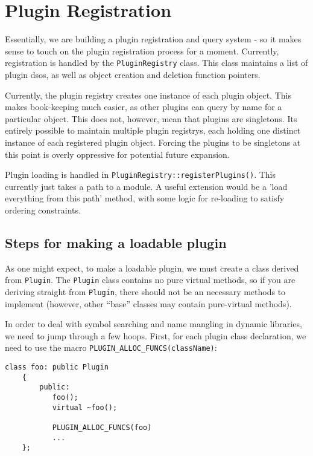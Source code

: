 
\section{Plugin Registration}

Essentially, we are building a plugin registration and
query system - so it makes sense to touch on the plugin 
registration process for a moment. Currently, registration 
is handled by the {\tt PluginRegistry} class. This class maintains
a list of plugin dsos, as well as object creation and deletion function
pointers. 

Currently, the plugin registry creates one instance of each 
plugin object. This makes book-keeping much easier, as other plugins
can query by name for a particular object. This does not, however, 
mean that plugins are singletons. Its entirely possible to maintain
multiple plugin registrys, each holding one distinct instance of
each registered plugin object. Forcing the plugins to be singletons 
at this point is overly oppressive for potential future expansion.

Plugin loading is handled in {\tt PluginRegistry::registerPlugins()}. 
This currently just takes a path to a module. A useful extension would
be a 'load everything from this path' method, with some logic for
re-loading to satisfy ordering constraints.

\subsection{Steps for making a loadable plugin}

As one might expect, to make a loadable plugin, we must create a 
class derived from {\tt Plugin}. The {\tt Plugin} class contains no pure
virtual methods, so if you are deriving straight from {\tt Plugin}, there
should not be an necessary methods to implement (however, 
other ``base'' classes may contain pure-virtual methods).

In order to deal with symbol searching and name mangling in dynamic
libraries, we need to jump through a few hoops. First, for each 
plugin class declaration, we need to use the macro
{\tt PLUGIN\_ALLOC\_FUNCS(className)}:
 
\begin{lstlisting}[frame=single]
    class foo: public Plugin
    {
        public:
           foo();
           virtual ~foo();

           PLUGIN_ALLOC_FUNCS(foo)
           ...
    };
\end{lstlisting}


